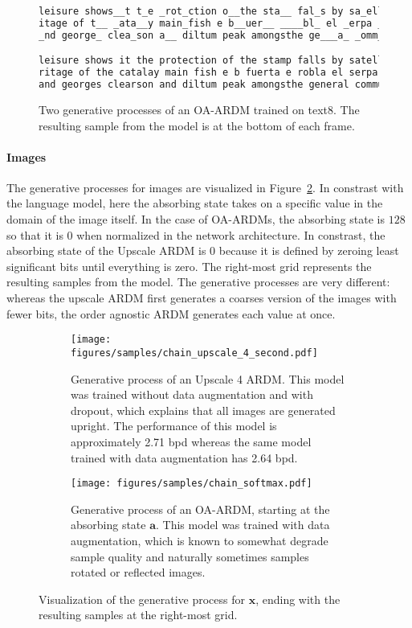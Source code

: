 \documentclass{article} \usepackage{iclr2022_conference,times}
\def\va{{\bm{a}}}
\def\vx{{\bm{x}}}
\begin{document}
\begin{figure}[H]
\begin{minipage}{.999\textwidth}
\begin{lstlisting}[language=java]
leisure shows__t t_e _rot_ction o__the sta__ fal_s by sa_ellite _oard_a_d troo_s __ce tenu_ he_
itage of t__ _ata__y main_fish e b__uer__ ____bl_ el _erpa _d_n_a_ tin_a__s island compo_it_on 
_nd george_ clea_son a__ diltum peak amongsthe ge___a_ _omm_

leisure shows it the protection of the stamp falls by satellite board and troops lace tenua he
ritage of the catalay main fish e b fuerta e robla el serpa eden at tingalas island composition
and georges clearson and diltum peak amongsthe general commu
\end{lstlisting}
\end{minipage}
\caption{Two generative processes of an OA-ARDM trained on text8. The resulting sample from the model is at the bottom of each frame.}
\label{fig:oa_ardm_chain_text8}
\end{figure}
\newpage


\paragraph{Images} The generative processes for images are visualized in Figure~\ref{fig:ardm_chain_cifar10_appendix}. In constrast with the language model, here the absorbing state takes on a specific value in the domain of the image itself. In the case of OA-ARDMs, the absorbing state is $128$ so that it is $0$ when normalized in the network architecture. In constrast, the absorbing state of the Upscale ARDM is $0$ because it is defined by zeroing least significant bits until everything is zero. The right-most grid represents the resulting samples from the model. The generative processes are very different: whereas the upscale ARDM first generates a coarses version of the images with fewer bits, the order agnostic ARDM generates each value at once.


\begin{figure}[H]
\centering
\begin{subfigure}{\textwidth}
    \texttt{[image: figures/samples/chain\_upscale\_4\_second.pdf]}
\caption{Generative process of an Upscale 4 ARDM. This model was trained without data augmentation and with dropout, which explains that all images are generated upright. The performance of this model is approximately 2.71 bpd whereas the same model trained with data augmentation has 2.64 bpd.}
\end{subfigure}
\begin{subfigure}{\textwidth}
    \texttt{[image: figures/samples/chain\_softmax.pdf]}
\caption{Generative process of an OA-ARDM, starting at the absorbing state $\va$. This model was trained with data augmentation, which is known to somewhat degrade sample quality and naturally sometimes samples rotated or reflected images.}
\end{subfigure}
\caption{Visualization of the generative process for $\vx$, ending with the resulting samples at the right-most grid.}
\label{fig:ardm_chain_cifar10_appendix}
\end{figure} 
\newpage
\end{document}
